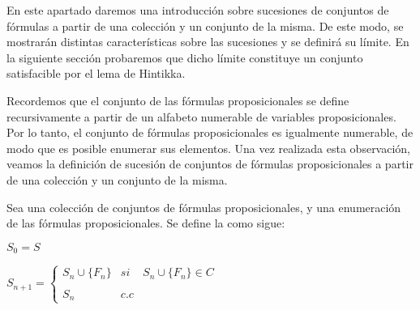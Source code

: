 %
\begin{isabellebody}%
%
%
\isadelimtheory
%
\endisadelimtheory
%
\isatagtheory
%
\endisatagtheory
{\isafoldtheory}%
%
\isadelimtheory
%
\endisadelimtheory
%
\begin{isamarkuptext}%
%
\end{isamarkuptext}\isamarkuptrue%
%
\begin{isamarkuptext}%
%
\end{isamarkuptext}\isamarkuptrue%
%
\isadelimdocument
%
\endisadelimdocument
%
\isatagdocument
%
\isamarkuptrue%
%
\endisatagdocument
{\isafolddocument}%
%
\isadelimdocument
%
\endisadelimdocument
%
\begin{isamarkuptext}%
En este apartado daremos una introducción sobre sucesiones de conjuntos de fórmulas a 
  partir de una colección y un conjunto de la misma. De este modo, se mostrarán distintas 
  características sobre las sucesiones y se definirá su límite. En la siguiente sección 
  probaremos que dicho límite constituye un conjunto satisfacible por el lema de Hintikka.


  Recordemos que el conjunto de las fórmulas proposicionales se define recursivamente a partir 
  de un alfabeto numerable de variables proposicionales. Por lo tanto, el conjunto de fórmulas 
  proposicionales es igualmente numerable, de modo que es posible enumerar sus elementos. Una vez 
  realizada esta observación, veamos la definición de sucesión de conjuntos de fórmulas 
  proposicionales a partir de una colección y un conjunto de la misma.

\begin{definicion}
  Sea  una colección de conjuntos de fórmulas proposicionales,  y  una 
  enumeración de las fórmulas proposicionales. Se define la  como sigue:

  $S_{0} = S$

  $S_{n+1} = \left\{ \begin{array}{lcc} S_{n} \cup \{F_{n}\} &  si  & S_{n} \cup \{F_{n}\} \in C \\ \\ S_{n} & c.c \end{array} \right.$ 
\end{definicion}


\end{isamarkuptext}
\end{isabellebody}
